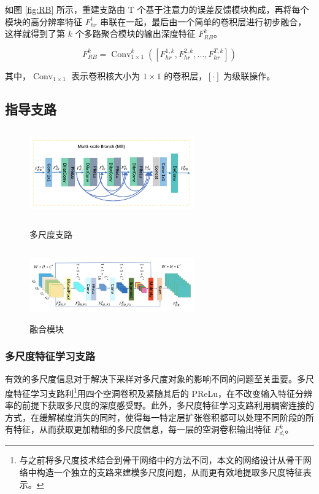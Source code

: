 \documentclass{vip-theme}
\begin{document}
如图 \ref{fig:RB} 所示，重建支路由 T 个基于注意力的误差反馈模块构成，再将每个模块的高分辨率特征 $F_{h r}^{t}$ 串联在一起，最后由一个简单的卷积层进行初步融合，这样就得到了第 $k$ 个多路聚合模块的输出深度特征 $F_{R B}^{k}$。

\begin{equation}
F_{R B}^{k}=\operatorname{Conv}_{1 \times 1}^{k}\left(\left[F_{h r}^{1, k}, F_{h r}^{2, k}, \ldots, F_{h r}^{T, k}\right]\right)
\end{equation}

其中，$\operatorname{Conv}_{1 \times 1}$ 表示卷积核大小为 $1 \times 1$ 的卷积层，$[\cdot]$ 为级联操作。

\subsection{指导支路}

\begin{figure}[!htbp]
	\begin{minipage}[t]{0.5\linewidth}
		\centering
		\includegraphics[height=1.5in,width=2.8in]{figure/MB}
		\caption{多尺度支路}
		\label{fig:MB}
	\end{minipage}
	\begin{minipage}[t]{0.5\linewidth}
		\centering
		\includegraphics[height=1.2in,width=2.8in]{figure/FB}
		\caption{融合模块}
		\label{fig:FB}
	\end{minipage}
\end{figure}



\subsubsection{多尺度特征学习支路}

有效的多尺度信息对于解决下采样对多尺度对象的影响不同的问题至关重要。多尺度特征学习支路利\footnote{与之前将多尺度技术结合到骨干网络中的方法不同，本文的网络设计从骨干网络中构造一个独立的支路来建模多尺度问题，从而更有效地提取多尺度特征表示。}用四个空洞卷积及紧随其后的 PReLu，在不改变输入特征分辨率的前提下获取多尺度的深度感受野。此外，多尺度特征学习支路利用稠密连接的方式，在缓解梯度消失的同时，使得每一特定层扩张卷积都可以处理不同阶段的所有特征，从而获取更加精细的多尺度信息，每一层的空洞卷积输出特征 $F_{d_{i}}^{k}$。
\end{document}

